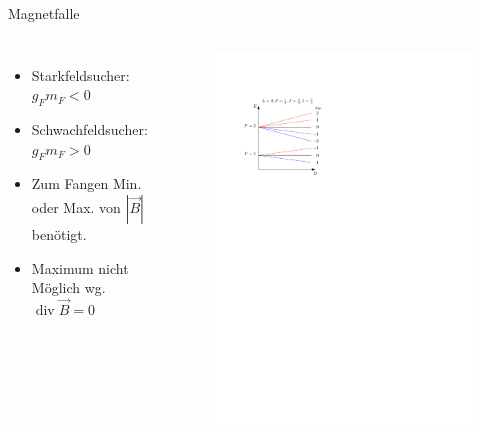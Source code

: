 \documentclass[12pt]{beamer}
\DeclareMathOperator{\divergence}{div}
\begin{document}
\begin{frame}{Magnetfalle}
	\begin{columns}
	\begin{itemize}
		\item Starkfeldsucher: $g_F m_F < 0$
		\item Schwachfeldsucher: $g_F m_F > 0$
		\item Zum Fangen Min. oder Max. von $|\vec{B}|$ benötigt.
		\item Maximum nicht Möglich wg. $\divergence \vec{B} = 0$
	\end{itemize}
		\begin{figure}
			\centering
			\includegraphics{./figures/magnetfalle.pdf}
		\end{figure}
	\end{columns}
\end{frame}
\end{document}
